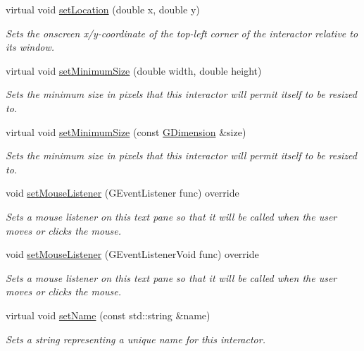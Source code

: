 \begin{DoxyCompactItemize}
virtual void \mbox{\hyperlink{classGInteractor_a04594e8ba9b98513a64f1da00dcae18c}{set\+Location}} (double x, double y)
\begin{DoxyCompactList}\small\item\em Sets the onscreen x/y-\/coordinate of the top-\/left corner of the interactor relative to its window. \end{DoxyCompactList}\item 
virtual void \mbox{\hyperlink{classGInteractor_a0cf428e207b7f22cc08138a90b1b87b2}{set\+Minimum\+Size}} (double width, double height)
\begin{DoxyCompactList}\small\item\em Sets the minimum size in pixels that this interactor will permit itself to be resized to. \end{DoxyCompactList}\item 
virtual void \mbox{\hyperlink{classGInteractor_a3b1046117ac6cb7abe467e00ba8a81f4}{set\+Minimum\+Size}} (const \mbox{\hyperlink{structGDimension}{G\+Dimension}} \&size)
\begin{DoxyCompactList}\small\item\em Sets the minimum size in pixels that this interactor will permit itself to be resized to. \end{DoxyCompactList}\item 
void \mbox{\hyperlink{classGBrowserPane_a2c6a3746da7ffa3819294896d4423059}{set\+Mouse\+Listener}} (G\+Event\+Listener func) override
\begin{DoxyCompactList}\small\item\em Sets a mouse listener on this text pane so that it will be called when the user moves or clicks the mouse. \end{DoxyCompactList}\item 
void \mbox{\hyperlink{classGBrowserPane_a3ed42c5f929cba378927916dd73e6576}{set\+Mouse\+Listener}} (G\+Event\+Listener\+Void func) override
\begin{DoxyCompactList}\small\item\em Sets a mouse listener on this text pane so that it will be called when the user moves or clicks the mouse. \end{DoxyCompactList}\item 
virtual void \mbox{\hyperlink{classGInteractor_a9d3a2685df23b5e7cbf59c19c4a1f9b5}{set\+Name}} (const std\+::string \&name)
\begin{DoxyCompactList}\small\item\em Sets a string representing a unique name for this interactor. \end{DoxyCompactList}\item 

\end{DoxyCompactItemize}
